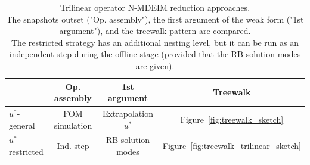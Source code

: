 \documentclass[../../thesis.tex]{subfiles}
\begin{document}
\begin{table}[h]
    \centering
    \caption{Trilinear operator N-MDEIM reduction approaches.
    \\
    The snapshots outset ("Op. assembly"), 
    the first argument of the weak form ("1st argument"),
    and the treewalk pattern are compared.
    \\
    The restricted strategy has an additional nesting level, 
    but it can be run as an independent step during the offline stage
    (provided that the RB solution modes are given).}
    \begin{tabular}{@{}lccc@{}}
    \toprule
                       & Op. assembly   & 1st argument          & Treewalk                                   \\ \midrule
    $u^{*}$-general    & FOM simulation & Extrapolation $u^{*}$ & Figure~\ref{fig:treewalk_sketch}           \\
    $u^{*}$-restricted & Ind. step      & RB solution modes     & Figure~\ref{fig:treewalk_trilinear_sketch} \\ \bottomrule
    \end{tabular}
    \label{tab:summary_trilinear_strategies}
\end{table}

\end{document}
